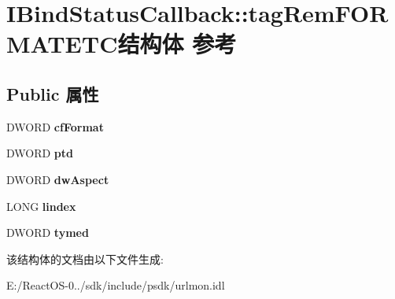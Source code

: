 \hypertarget{struct_i_bind_status_callback_1_1tag_rem_f_o_r_m_a_t_e_t_c}{}\section{I\+Bind\+Status\+Callback\+:\+:tag\+Rem\+F\+O\+R\+M\+A\+T\+E\+T\+C结构体 参考}
\label{struct_i_bind_status_callback_1_1tag_rem_f_o_r_m_a_t_e_t_c}
\subsection*{Public 属性}
\begin{DoxyCompactItemize}
\item 
\mbox{\label{struct_i_bind_status_callback_1_1tag_rem_f_o_r_m_a_t_e_t_c_a12a75971cabe5d2170971e98ee96abec}} 
D\+W\+O\+RD {\bfseries cf\+Format}
\item 
\mbox{\label{struct_i_bind_status_callback_1_1tag_rem_f_o_r_m_a_t_e_t_c_a8e9c9ca12d00cc03dff466dd51690fec}} 
D\+W\+O\+RD {\bfseries ptd}
\item 
\mbox{\label{struct_i_bind_status_callback_1_1tag_rem_f_o_r_m_a_t_e_t_c_ac74e6cf6a9db42fc733ea5530a982bfb}} 
D\+W\+O\+RD {\bfseries dw\+Aspect}
\item 
\mbox{\label{struct_i_bind_status_callback_1_1tag_rem_f_o_r_m_a_t_e_t_c_a7bb06feb9d731ff29251552d86ff4756}} 
L\+O\+NG {\bfseries lindex}
\item 
\mbox{\label{struct_i_bind_status_callback_1_1tag_rem_f_o_r_m_a_t_e_t_c_ac1006a196f4d39d4fd266365caf2c406}} 
D\+W\+O\+RD {\bfseries tymed}
\end{DoxyCompactItemize}


该结构体的文档由以下文件生成\+:\begin{DoxyCompactItemize}
\item 
E\+:/\+React\+O\+S-\/0../sdk/include/psdk/urlmon.\+idl\end{DoxyCompactItemize}
